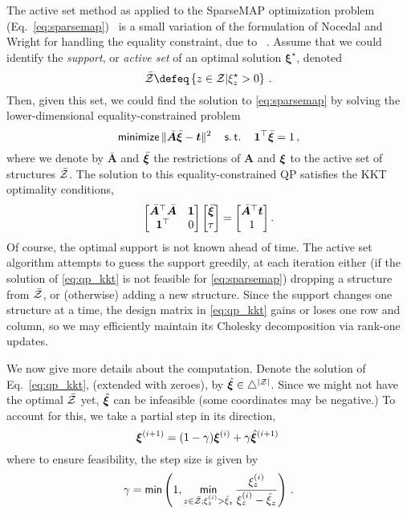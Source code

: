 The active set method
\citep[Chapters 16.4 \& 16.5]{nocedalwright} as applied to the SparseMAP
optimization problem (Eq.~\ref{eq:sparsemap})~\cite{sparsemap}
is a small variation of the formulation of Nocedal and Wright for handling
the equality constraint, due to ~\citet[Section 6]{ad3}.
Assume that we could identify the \emph{support}, or
\emph{active set} of an optimal solution  $\bm{\xi}^\star$, denoted
\[\bar\ZZ \defeq \left\{z \in \ZZ |\xi^\star_z > 0\right\}\,. \]
Then, given this set, we could find the solution to \eqref{eq:sparsemap}
by solving the lower-dimensional equality-constrained problem
%
\begin{equation}
    \operatorname*{\mathsf{minimize}}\| \bar{\bm{A}}\bar{\bm{\xi}} - \bm{t} \|^2
    \quad\operatorname*{\mathsf{s.t.}}\quad\bm{1}^\top\bar{\bm{\xi}} = 1\,,
\end{equation}
%
where we denote by $\bar{\bm{A}}$ and $\bar{\bm{\xi}}$ the restrictions of $\bm{A}$
and $\bm{\xi}$ to the active set of structures $\bar{\mathcal{Z}}$.
The solution to this equality-constrained QP satisfies the KKT optimality
conditions,
%
\begin{equation}
    \label{eq:qp_kkt}
    \begin{bmatrix}
        {\bar{\bm{A}}}^\top \bar{\bm{A}} & \bm{1} \\
        \bm{1}^\top                      & 0      \\
    \end{bmatrix}
    \begin{bmatrix} \bar{\bm{\xi}} \\ \tau \end{bmatrix}
    =
    \begin{bmatrix} \bar{\bm{A}}^\top \bm{t} \\ 1 \end{bmatrix}.
\end{equation}
%
Of course, the optimal support is not known ahead of time. The active set
algorithm attempts to guess the support greedily,
at each iteration either (if the solution of \eqref{eq:qp_kkt} is not feasible
for \eqref{eq:sparsemap})
dropping a structure from $\bar{\mathcal{Z}}$, or (otherwise) adding a new structure.
Since the support changes one structure at a time, the design matrix in
\eqref{eq:qp_kkt} gains or loses one row and column, so
we may efficiently maintain its Cholesky decomposition via rank-one updates.

We now give more details about the computation.
Denote the solution of Eq.~\ref{eq:qp_kkt}, (extended with zeroes),
by $\hat{\bm{\xi}} \in \triangle^{|\mathcal{Z}|}$.
Since we might not have the optimal $\bar{\mathcal{Z}}$ yet, $\hat{\bm{\xi}}$ can be infeasible
(some coordinates may be negative.)
To account for this, we take a partial step in its direction,
%
\begin{equation}
    \bm{\xi}^{(i+1)} = (1-\gamma)\bm{\xi}^{(i)} + \gamma \hat{\bm{\xi}}^{(i+1)}\,
\end{equation}
%
where to ensure feasibility, the step size is given by
%
\begin{equation}\label{eq:step_size}
    \gamma = \operatorname*{\mathsf{min}} \left(1, \operatorname*{\mathsf{min}}_{z \in \bar{\mathcal{Z}}; \xi^{(i)}_z > \hat{\xi}_z}
    \frac{
        \xi^{(i)}_z
    }{
        \xi^{(i)}_z - \hat{\xi}_z}
    \right)\,.
\end{equation}

